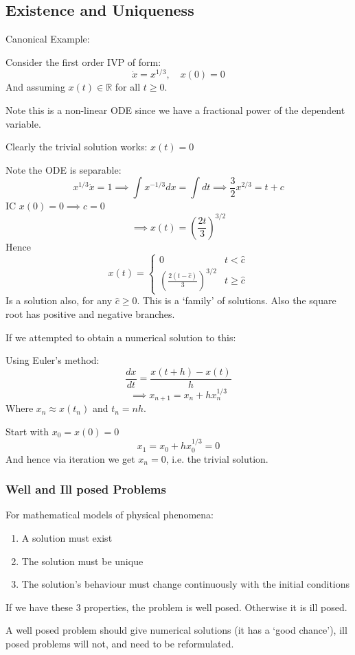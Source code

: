 \documentclass{X:/Documents/Coding/Latex/myassignment}
\begin{document}
\subsection{Existence and Uniqueness}
Canonical Example:

Consider the first order IVP of form:
\[\dot x = x^{1/3},\quad x(0) = 0\]
And assuming $x(t) \in \mathbb{R}$ for all $t\geq 0$.

Note this is a non-linear ODE since we have a fractional power of the dependent variable.

Clearly the trivial solution works: $x(t) =0$

Note the ODE is separable:
\[x^{1/3} \dot x = 1 \implies \int x^{-1/3} dx = \int dt \implies \frac32 x^{2/3} = t+c\]
IC $x(0) = 0 \implies c=0$ 
\[\implies x(t) = \left(\frac{2t}{3}\right)^{3/2}\]
Hence
\[x(t) = \begin{cases}
    0& t < \hat c\\
    \left(\frac{2(t-\hat c)}{3}\right)^{3/2} & t\geq \hat c
\end{cases}\]
Is a solution also, for any $\hat c \geq 0$. This is a `family' of solutions. Also the square root has positive and negative branches.


If we attempted to obtain a numerical solution to this:

Using Euler's method:
\[\frac{dx}{dt} = \frac{x(t+h) - x(t)}{h}\]
\[\implies x_{n+1} = x_n + h x_n^{1/3}\]
Where $x_n \approx x(t_n)$ and $t_n = nh$.

Start with $x_0 = x(0) =0$
\[x_1 = x_0 + hx_0^{1/3} =0\]
And hence via iteration we get $x_n = 0$, i.e. the trivial solution.

\subsubsection{Well and Ill posed Problems}
For mathematical models of physical phenomena:
\begin{enumerate}
    \item A solution must exist
    \item The solution must be unique
    \item The solution's behaviour must change continuously with the initial conditions 
\end{enumerate}
If we have these 3 properties, the problem is well posed. Otherwise it is ill posed.

A well posed problem should give numerical solutions (it has a `good chance'), ill posed problems will not, and need to be reformulated.
\end{document}
